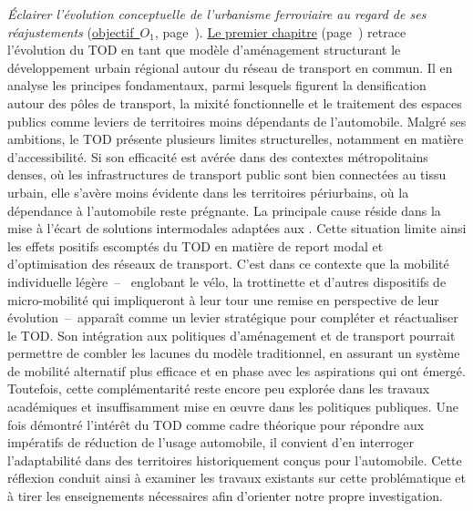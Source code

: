 \textsl{Éclairer l'évolution conceptuelle de l'urbanisme ferroviaire au regard de ses réajustements} (\hyperref[objectif-1]{objectif~\(O_1\)}, page~\pageref{objectif-1}). \hyperref[chap1:titre]{Le premier chapitre} (page~\pageref{chap1:titre}) retrace l’évolution du \acrshort{TOD} en tant que modèle d’aménagement structurant le développement urbain régional autour du réseau de transport en commun. Il en analyse les principes fondamentaux, parmi lesquels figurent la densification autour des pôles de transport, la mixité fonctionnelle et le traitement des espaces publics comme leviers de territoires moins dépendants de l'automobile. Malgré ses ambitions, le \acrshort{TOD} présente plusieurs limites structurelles, notamment en matière d’accessibilité. Si son efficacité est avérée dans des contextes métropolitains denses, où les infrastructures de transport public sont bien connectées au tissu urbain, elle s’avère moins évidente dans les territoires périurbains, où la dépendance à l’automobile reste prégnante. La principale cause réside dans la mise à l'écart de solutions intermodales adaptées aux . Cette situation limite ainsi les effets positifs escomptés du \acrshort{TOD} en matière de report modal et d’optimisation des réseaux de transport. C’est dans ce contexte que la mobilité individuelle légère~–~ englobant le vélo, la trottinette et d'autres dispositifs de micro-mobilité qui impliqueront à leur tour une remise en perspective de leur évolution~–~apparaît comme un levier stratégique pour compléter et réactualiser le \acrshort{TOD}. Son intégration aux politiques d’aménagement et de transport pourrait permettre de combler les lacunes du modèle traditionnel, en assurant un système de mobilité alternatif plus efficace et en phase avec les aspirations qui ont émergé. Toutefois, cette complémentarité reste encore peu explorée dans les travaux académiques et insuffisamment mise en œuvre dans les politiques publiques. Une fois démontré l’intérêt du \acrshort{TOD} comme cadre théorique pour répondre aux impératifs de réduction de l’usage automobile, il convient d’en interroger l’adaptabilité dans des territoires historiquement conçus pour l’automobile. Cette réflexion conduit ainsi à examiner les travaux existants sur cette problématique et à tirer les enseignements nécessaires afin d’orienter notre propre investigation.%

